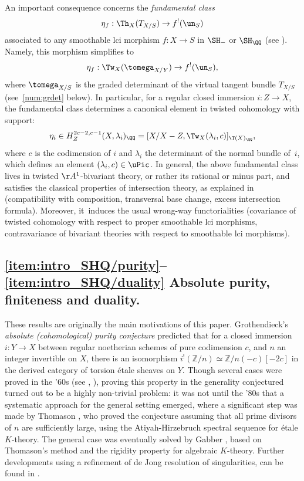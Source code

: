An important consequence concerns the \emph{fundamental class}
\[
\eta_f : \Th_X(T_{X/S}) \to f^!(\un_S)
\]
associated to any smoothable lci morphism $f : X \to S$ in $\SH_-$ or $\SH_\QQ$ (see \cite[4.3.4]{DJK}).
Namely, this morphism simplifies to
\[
\eta_f : \Tw_X(\tomega_{X/Y}) \to f^!(\un_S),
\]
where $\tomega_{X/S}$ is the graded determinant of the virtual tangent bundle $T_{X/S}$ (see~\ref{num:grdet} below).
In particular, for a regular closed immersion $i : Z \to X$, the fundamental class determines a canonical element in twisted cohomology with support:
\[
\eta_i
\in H^{2c-2,c-1}_Z(X,\lambda_i)_\QQ
= [X/X-Z,\Tw_X(\lambda_i,c)]_{\T(X)_\QQ},
\]
where $c$ is the codimension of $i$ and $\lambda_i$ the determinant of the normal bundle of~$i$, which defines an element $(\lambda_i,c)\in \uPic$. In general, the above fundamental class lives in twisted $\AA^1$-bivariant theory, or rather its rational or minus part, and satisfies the classical properties of intersection theory, as explained in \cite{DJK} (compatibility with composition, transversal base change, excess intersection formula).
Moreover, it~induces the usual wrong-way functorialities (covariance of twisted cohomology with respect to proper smoothable lci morphisms, contravariance of bivariant theories with respect to smoothable lci morphisms).

\subsection*{\eqref{item:intro_SHQ/purity}--\eqref{item:intro_SHQ/duality} Absolute purity, finiteness and duality.}
These results are originally the main motivations of this paper.
Grothendieck's \emph{absolute (cohomological) purity conjecture} \cite[I\,3.1.4]{SGA5} predicted that for a closed immersion $i:Y\to X$ between regular noetherian schemes of pure codimension $c$, and $n$ an integer invertible on $X$, there is an isomorphism $i^!(\mathbb{Z}/n)\simeq \mathbb{Z}/n(-c)[-2c]$ in the derived category of torsion étale sheaves on $Y$.
Though several cases were proved in the '60s (see \cite[I\,5.1]{SGA5}, \cite[XVIII\,3.2.5]{SGA4}), proving this property in the generality conjectured turned out to be a highly non-trivial problem: it was not until the '80s that a systematic approach for the general setting emerged, where a significant step was made by Thomason \cite{Thomason1}, who proved the conjecture assuming that all prime divisors of $n$ are sufficiently large, using the Atiyah-Hirzebruch spectral sequence for étale $K$-theory.
The general case was eventually solved by Gabber \cite{Fuji}, based on Thomason's method and the rigidity property for algebraic $K$-theory.
Further developments using a refinement of de Jong resolution of singularities, can be found in \cite[Exp.\,XVI]{Gabber}.


